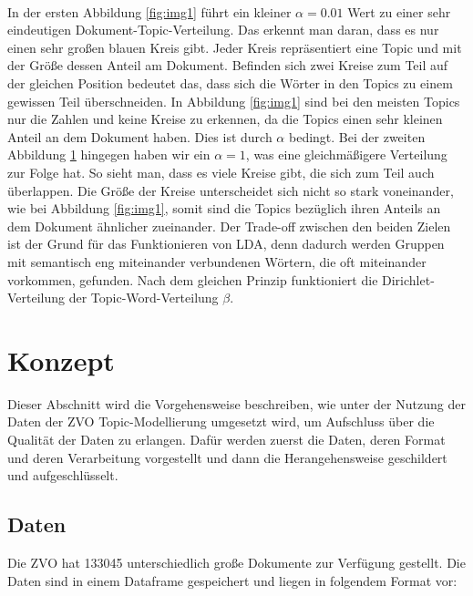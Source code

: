 \documentclass[german,version-2020-11]{uzl-thesis}
\begin{document}
\begin{itemize}
\begin{figure}[h]
\begin{center}
\label{fig:img2}
\end{center}
\end{figure}\\
In der ersten Abbildung \ref{fig:img1} führt ein kleiner $\alpha = 0.01$ Wert zu einer sehr eindeutigen Dokument-Topic-Verteilung. Das erkennt man daran, dass es nur einen sehr großen blauen Kreis gibt. Jeder Kreis repräsentiert eine Topic und mit der Größe dessen Anteil am Dokument. Befinden sich zwei Kreise zum Teil auf der gleichen Position bedeutet das, dass sich die Wörter in den Topics zu einem gewissen Teil überschneiden. In Abbildung \ref{fig:img1} sind bei den meisten Topics nur die Zahlen und keine Kreise zu erkennen, da die Topics einen sehr kleinen Anteil an dem Dokument haben. Dies ist durch $\alpha$ bedingt. Bei der zweiten Abbildung \ref{fig:img2} hingegen haben wir ein $\alpha = 1$, was eine gleichmäßigere Verteilung zur Folge hat. So sieht man, dass es viele Kreise gibt, die sich zum Teil auch überlappen. Die Größe der Kreise unterscheidet sich nicht so stark voneinander, wie bei Abbildung \ref{fig:img1}, somit sind die Topics bezüglich ihren Anteils an dem Dokument ähnlicher zueinander. Der Trade-off zwischen den beiden Zielen ist der Grund für das Funktionieren von LDA, denn dadurch werden Gruppen mit semantisch eng miteinander verbundenen Wörtern, die oft miteinander vorkommen, gefunden. Nach dem gleichen Prinzip funktioniert die Dirichlet-Verteilung der Topic-Word-Verteilung $\beta$.  



\chapter{Konzept} %

Dieser Abschnitt wird die Vorgehensweise beschreiben, wie unter der Nutzung der Daten der ZVO Topic-Modellierung umgesetzt wird, um Aufschluss über die Qualität der Daten zu erlangen. Dafür werden zuerst die Daten, deren Format und deren Verarbeitung vorgestellt und dann die Herangehensweise geschildert und aufgeschlüsselt.

\section{Daten}
Die ZVO hat 133045 unterschiedlich große Dokumente zur Verfügung gestellt. Die Daten sind in einem Dataframe gespeichert und liegen in folgendem Format vor: 


\end{itemize}
\end{document}
